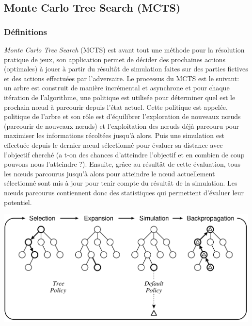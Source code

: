 \subsection{Monte Carlo Tree Search (MCTS)}

\subsubsection*{Définitions}
\textit{Monte Carlo Tree Search} (MCTS) est avant tout une méthode pour la résolution pratique de jeux, son application permet de décider des prochaines actions (optimales) à jouer à partir du résultât de simulation faites sur des parties fictives et des actions effectuées par l'adversaire.
Le processus du MCTS est le suivant: un arbre est construit de manière incrémental et asynchrone et pour chaque itération de l'algorithme, une politique est utilisée pour déterminer quel est le prochain nœud à parcourir depuis l'état actuel. Cette politique est appelée, politique de l'arbre et son rôle est d'équilibrer l'exploration de nouveaux nœuds (parcourir de nouveaux nœuds) et l'exploitation des nœuds déjà parcouru pour maximiser les informations récoltées jusqu'à alors. Puis une simulation est effectuée depuis le dernier nœud sélectionné pour évaluer sa distance avec l'objectif cherché (a t-on des chances d'atteindre l'objectif et en combien de coup pouvons nous l'atteindre ?). Ensuite, grâce au résultât de cette évaluation, tous les nœuds parcourus jusqu'à alors pour atteindre le nœud actuellement sélectionné sont mis à jour pour tenir compte du résultât de la simulation. Les nœuds parcourus contiennent donc des statistiques qui permettent d'évaluer leur potentiel.

\begin{center}
    \includegraphics[scale=0.5]{../ressources/images/MCTS-example-iteration.png}
    \label{example-mcts-iteration}
\end{center}

